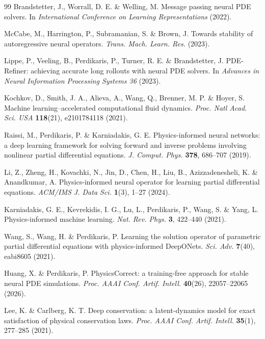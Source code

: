 \documentclass[11pt,a4paper]{article}
\begin{document}
\begin{thebibliography}{99}
 Brandstetter, J., Worrall, D. E. \& Welling, M. Message passing neural PDE solvers. In \emph{International Conference on Learning Representations} (2022).

 McCabe, M., Harrington, P., Subramanian, S. \& Brown, J. Towards stability of autoregressive neural operators. \emph{Trans. Mach. Learn. Res.} (2023).

 Lippe, P., Veeling, B., Perdikaris, P., Turner, R. E. \& Brandstetter, J. PDE-Refiner: achieving accurate long rollouts with neural PDE solvers. In \emph{Advances in Neural Information Processing Systems 36} (2023).

 Kochkov, D., Smith, J. A., Alieva, A., Wang, Q., Brenner, M. P. \& Hoyer, S. Machine learning--accelerated computational fluid dynamics. \emph{Proc. Natl Acad. Sci. USA} \textbf{118}(21), e2101784118 (2021).

 Raissi, M., Perdikaris, P. \& Karniadakis, G. E. Physics-informed neural networks: a deep learning framework for solving forward and inverse problems involving nonlinear partial differential equations. \emph{J. Comput. Phys.} \textbf{378}, 686--707 (2019).

 Li, Z., Zheng, H., Kovachki, N., Jin, D., Chen, H., Liu, B., Azizzadenesheli, K. \& Anandkumar, A. Physics-informed neural operator for learning partial differential equations. \emph{ACM/IMS J. Data Sci.} \textbf{1}(3), 1--27 (2024).

 Karniadakis, G. E., Kevrekidis, I. G., Lu, L., Perdikaris, P., Wang, S. \& Yang, L. Physics-informed machine learning. \emph{Nat. Rev. Phys.} \textbf{3}, 422--440 (2021).

 Wang, S., Wang, H. \& Perdikaris, P. Learning the solution operator of parametric partial differential equations with physics-informed DeepONets. \emph{Sci. Adv.} \textbf{7}(40), eabi8605 (2021).

 Huang, X. \& Perdikaris, P. PhysicsCorrect: a training-free approach for stable neural PDE simulations. \emph{Proc. AAAI Conf. Artif. Intell.} \textbf{40}(26), 22057--22065 (2026).

 Lee, K. \& Carlberg, K. T. Deep conservation: a latent-dynamics model for exact satisfaction of physical conservation laws. \emph{Proc. AAAI Conf. Artif. Intell.} \textbf{35}(1), 277--285 (2021).


\end{thebibliography}
\end{document}
